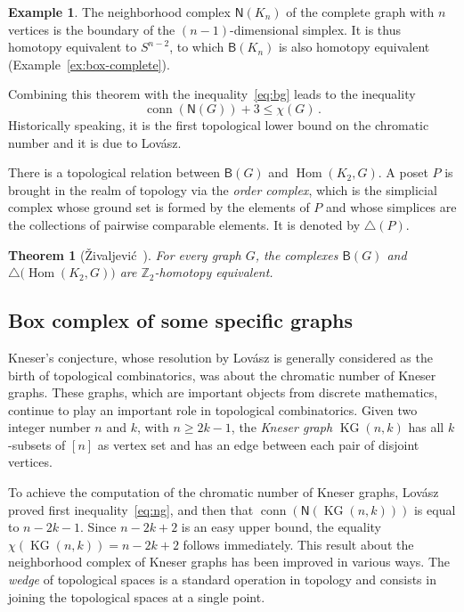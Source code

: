 \documentclass[12pt]{amsart}
\newtheorem{theorem}{Theorem}[section]
\theoremstyle{definition}
\newtheorem{example}{Example}
\def\Z{\mathbb{Z}}
\def\B{\mathsf{B}}
\def\N{\mathsf{N}}
\renewcommand{\geq}{\geqslant}
\renewcommand{\leq}{\leqslant}
\def\Hom{\operatorname{Hom}}
\def\KG{\operatorname{KG}}
\def\conn{\operatorname{conn}}
\begin{document}
\begin{example}
    The neighborhood complex $\N(K_n)$ of the complete graph with $n$ vertices is the boundary of the $(n-1)$-dimensional simplex. It is thus homotopy equivalent to $S^{n-2}$, to which $\B(K_n)$ is also homotopy equivalent (Example~\ref{ex:box-complete}).
\end{example}

Combining this theorem with the inequality~\eqref{eq:bg} leads to the inequality 
\begin{equation}\label{eq:ng}
\conn(\N(G))+3 \leq \chi(G)\, .
\end{equation}
Historically speaking, it is the first topological lower bound on the chromatic number and it is due to Lov\'asz.


There is a topological relation between $\B(G)$ and $\Hom(K_2,G)$. A poset $P$ is brought in the realm of topology via the \emph{order complex}, which is the simplicial complex whose ground set is formed by the elements of $P$ and whose simplices are the collections of pairwise comparable elements. It is denoted by $\triangle(P)$.


\begin{theorem}[\v{Z}ivaljevi\'c~\cite{vzivaljevic2005wi}]\label{thm:BH}
For every graph $G$, the complexes $\B(G)$ and ${\triangle}\big( \Hom(K_2,G) \big)$ are $\Z_2$-homotopy equivalent.
\end{theorem}


\subsection{Box complex of some specific graphs}\label{subsec:spec-graph}

Kneser's conjecture, whose resolution by Lov\'asz is generally considered as the birth of topological combinatorics, was about the chromatic number of Kneser graphs. These graphs, which are important objects from discrete mathematics, continue to play an important role in topological combinatorics. Given two integer number $n$ and $k$, with $n \geq 2k-1$, the {\em Kneser graph} $\KG(n,k)$ has all $k$-subsets of $[n]$ as vertex set and has an edge between each pair of disjoint vertices.

 To achieve the computation of the chromatic number of Kneser graphs, Lov\'asz proved first inequality~\eqref{eq:ng}, and then that $\conn(\N(\KG(n,k)))$ is equal to $n-2k-1$. Since $n-2k+2$ is an easy upper bound, the equality $\chi(\KG(n,k)) = n-2k+2$ follows immediately. This result about the neighborhood complex of Kneser graphs has been improved in various ways. The {\em wedge} of topological spaces is a standard operation in topology and consists in joining the topological spaces at a single point.
\end{document}
